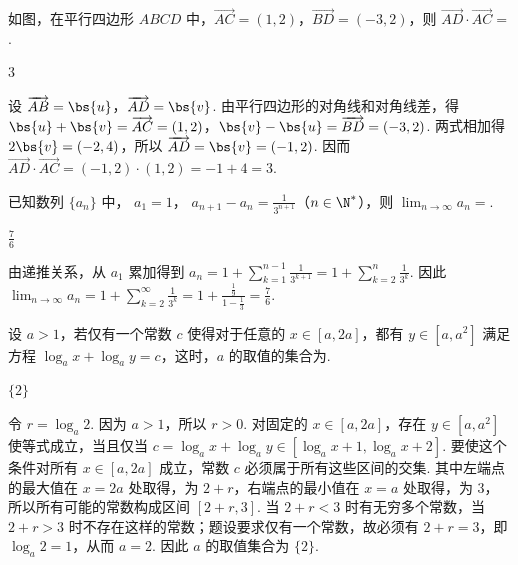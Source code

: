 \begin{problem}
如图，在平行四边形 \(ABCD\) 中，\(\overrightarrow{AC} = (1, 2)\)，\(\overrightarrow{BD} = (-3, 2)\)，则 \(\overrightarrow{AD} \cdot \overrightarrow{AC} = \)\fillinblank{}.

\end{problem}

\begin{answer}
\(3\)
\end{answer}

\begin{solution}
设 \(\overrightarrow{AB}=\bs{u}\)，\(\overrightarrow{AD}=\bs{v}\). 由平行四边形的对角线和对角线差，得 \(\bs{u}+\bs{v}=\overrightarrow{AC}=(1,2)\)，\(\bs{v}-\bs{u}=\overrightarrow{BD}=(-3,2)\). 两式相加得 \(2\bs{v}=(-2,4)\)，所以 \(\overrightarrow{AD}=\bs{v}=(-1,2)\). 因而 \(\overrightarrow{AD}\cdot\overrightarrow{AC}=(-1,2)\cdot(1,2)=-1+4=3\).
\end{solution}

\begin{problem}
已知数列 \( \{a_{n}\} \) 中， \( a_{1}=1 \)， \( a_{n+1}-a_{n}=\frac{1}{3^{n+1}} \)（\(n\in \N^{*}\)），则 \( \displaystyle\lim_{n\to\infty}a_{n}= \)\fillinblank{}.
\end{problem}

\begin{answer}
\(\frac{7}{6}\)
\end{answer}

\begin{solution}
由递推关系，从 \(a_1\) 累加得到 \(a_n=1+\sum_{k=1}^{n-1}\frac{1}{3^{k+1}}=1+\sum_{k=2}^{n}\frac{1}{3^k}\). 因此 \(\lim_{n\to\infty}a_n=1+\sum_{k=2}^{\infty}\frac{1}{3^k}=1+\frac{\frac{1}{9}}{1-\frac{1}{3}}=\frac76\).
\end{solution}

\begin{problem}
设 \(a > 1\)，若仅有一个常数 \(c\) 使得对于任意的 \(x \in [a, 2a]\)，都有 \(y \in [a, a^2]\) 满足方程 \(\log_a x + \log_a y = c\)，这时，\(a\) 的取值的集合为\fillinblank{}.
\end{problem}

\begin{answer}
\(\{2\}\)
\end{answer}

\begin{solution}
令 \(r=\log_a2\). 因为 \(a>1\)，所以 \(r>0\). 对固定的 \(x\in[a,2a]\)，存在 \(y\in[a,a^2]\) 使等式成立，当且仅当
\(c=\log_a x+\log_a y\in[\log_a x+1,\log_a x+2]\).
要使这个条件对所有 \(x\in[a,2a]\) 成立，常数 \(c\) 必须属于所有这些区间的交集. 其中左端点的最大值在 \(x=2a\) 处取得，为 \(2+r\)，右端点的最小值在 \(x=a\) 处取得，为 \(3\)，所以所有可能的常数构成区间 \([2+r,3]\). 当 \(2+r<3\) 时有无穷多个常数，当 \(2+r>3\) 时不存在这样的常数；题设要求仅有一个常数，故必须有 \(2+r=3\)，即 \(\log_a2=1\)，从而 \(a=2\). 因此 \(a\) 的取值集合为 \(\{2\}\).
\end{solution}

